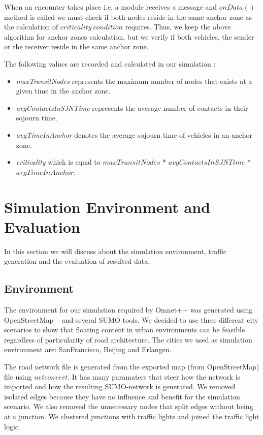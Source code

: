 When an encounter takes place i.e. a module receives a message and $onData()$
method is called we must check if both nodes reside in the same anchor zone as
the calculation of $criticality\ condition$ requires. Thus, we keep the above
algorithm for anchor zones calculation, but we verify if both vehicles, the
sender or the receiver reside in the same anchor zone.

The following values are recorded and calculated in our simulation :
\begin{itemize}
	\item {\it maxTransitNodes} represents the maximum number of nodes that exists
	at a given time in the anchor zone.
	\item {\it avgContactsInSJNTime} represents the average number of contacts in
	their sojourn time.
	\item {\it avgTimeInAnchor} denotes the average sojourn time of vehicles in an
	anchor zone.
	\item {\it criticality} which is equal to $maxTransitNodes$ *
	$avgContactsInSJNTime$ * $avgTimeInAnchor$.
\end{itemize}


\chapter{Simulation Environment and Evaluation}

In this section we will discuss about the simulation environment, traffic
generation and the evaluation of resulted data.

\section{Environment}

The environment for our simulation required by Omnet++ was generated using
OpenStreetMap ~\cite{openstreetmap} and several SUMO tools. We decided to use
three different city scenarios to show that floating content in urban
environments can be feasible regardless of particularity of road
architecture. The cities we used as simulation environment are: SanFrancisco,
Beijing and Erlangen.

The road network file is generated from the exported map (from OpenStreetMap)
file using $netconvert$. It has many paramaters that steer how the network is
imported and how the resulting SUMO-network is generated. We removed
isolated edges because they have no influence and benefit for the simulation
scenario. We also removed the unnecessary nodes that split edges without being
at a junction. We clustered junctions with traffic lights and joined the traffic
light logic.

